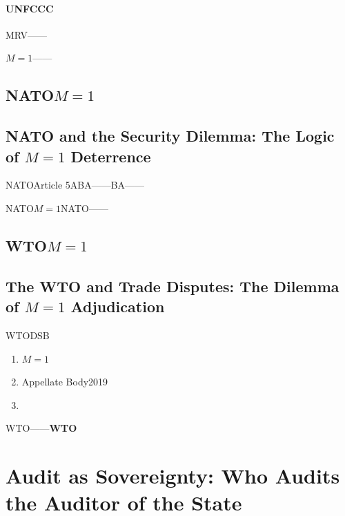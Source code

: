 \documentclass[12pt,a4paper]{article}
\theoremstyle{remark}
\begin{document}
\paragraph{UNFCCC}MRV\textbf{}——

\begin{keybox}[title=\textbf{ / Structural Conclusion}]
    \textbf{}$M=1$\textbf{}——
\end{keybox}

\subsection{NATO$M=1$}
\subsection{NATO and the Security Dilemma: The Logic of $M=1$ Deterrence}

NATOArticle 5\textbf{}ABA——BA——

NATO\textbf{}$M=1$NATO——

\subsection{WTO$M=1$}
\subsection{The WTO and Trade Disputes: The Dilemma of $M=1$ Adjudication}

WTODSB

\begin{enumerate}[label=(\arabic*)]
    \item \textbf{$M=1$}
    \item Appellate Body2019\textbf{}
    \item \textbf{}
\end{enumerate}

WTO——\textbf{WTO}


\section{}
\section{Audit as Sovereignty: Who Audits the Auditor of the State}
\end{document}
